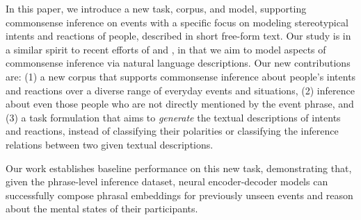\documentclass[11pt,a4paper]{article}
\begin{document}


In this paper, we introduce a new task, corpus, and model, supporting commonsense inference on events with a specific focus on modeling stereotypical intents and reactions of people, described in short free-form text. 
Our study is in a similar spirit to recent efforts of \citet{AffectiveEvents} and \citet{Zhang2017OrdinalCI}, in that we aim to model aspects of commonsense inference via natural language descriptions. 
Our new contributions are: (1) a new  corpus that supports commonsense inference about people's intents and reactions over a diverse range of everyday events and situations, (2) inference about even those people who are not directly mentioned by the event phrase, and (3) a task formulation that aims to \emph{generate} the textual descriptions of intents and reactions, instead of classifying their polarities or
classifying the inference relations between two given textual descriptions.






Our work establishes baseline performance on this new task, demonstrating that, given the phrase-level inference dataset, neural encoder-decoder models can successfully compose phrasal embeddings for previously unseen events and reason about the mental states of their participants. 
\end{document}
